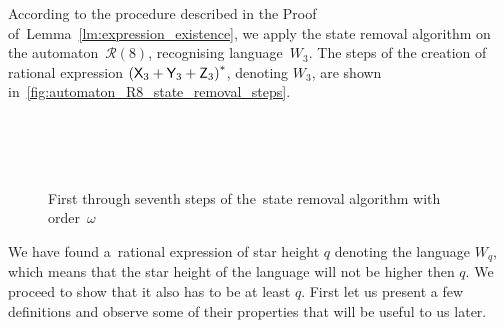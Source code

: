 \begin{example}
    According to the procedure described in the Proof of~Lemma~\ref*{lm:expression_existence}, we apply the state removal algorithm on the automaton~${\mathcal{R}(8)}$, recognising language~$W_3$. The steps of the creation of rational expression ${({\mathsf{X}}_3 + {\mathsf{Y}}_3 + {\mathsf{Z}}_3)}^*$, denoting $W_3$, are shown in~\autoref*{fig:automaton_R8_state_removal_steps}.

    \begin{figure}%
        \centering
        \hspace{-20pt}%
        \subfloat[][]{\label{fig:automaton_R8_state_removal_steps-a}%
            }%
        \hspace{70pt}%
        \subfloat[][]{\label{fig:automaton_R8_state_removal_steps-b}%
            }\\
        \subfloat[][]{\label{fig:automaton_R8_state_removal_steps-c}%
            }%
        \hspace{8pt}%
        \subfloat[][]{\label{fig:automaton_R8_state_removal_steps-d}%
            }\\
        \subfloat[][]{\label{fig:automaton_R8_state_removal_steps-e}%
            }\\
        \subfloat[][]{\label{fig:automaton_R8_state_removal_steps-f}%
            }%
        \hspace{40pt}%
        \subfloat[][]{\label{fig:automaton_R8_state_removal_steps-g}%
            }%
        \caption{First through seventh steps of the~state removal algorithm with order~$\omega$\\ }\label{fig:automaton_R8_state_removal_steps}%
    \end{figure}
\end{example}

We have found a~rational expression of star height $q$ denoting the language $W_q$, which means that the star height of the language will not be higher then $q$. We proceed to show that it also has to be at least $q$. First let us present a few definitions and observe some of their properties that will be useful to us later.

